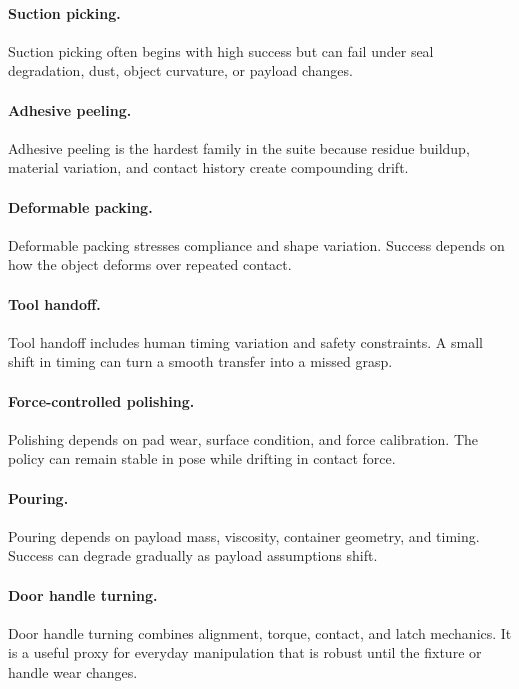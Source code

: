 \documentclass{article}
\begin{document}
\paragraph{Suction picking.}
Suction picking often begins with high success but can fail under seal
degradation, dust, object curvature, or payload changes.

\paragraph{Adhesive peeling.}
Adhesive peeling is the hardest family in the suite because residue buildup,
material variation, and contact history create compounding drift.

\paragraph{Deformable packing.}
Deformable packing stresses compliance and shape variation. Success depends on
how the object deforms over repeated contact.

\paragraph{Tool handoff.}
Tool handoff includes human timing variation and safety constraints. A small
shift in timing can turn a smooth transfer into a missed grasp.

\paragraph{Force-controlled polishing.}
Polishing depends on pad wear, surface condition, and force calibration. The
policy can remain stable in pose while drifting in contact force.

\paragraph{Pouring.}
Pouring depends on payload mass, viscosity, container geometry, and timing.
Success can degrade gradually as payload assumptions shift.

\paragraph{Door handle turning.}
Door handle turning combines alignment, torque, contact, and latch mechanics.
It is a useful proxy for everyday manipulation that is robust until the fixture
or handle wear changes.
\end{document}
